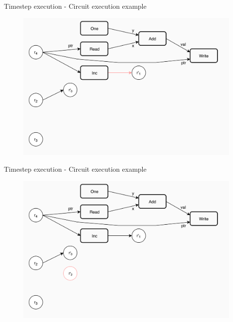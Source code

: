 \documentclass[xcolor={usenames}]{beamer}
\begin{document}
  \begin{frame}{Timestep execution - Circuit execution example}
  	\begin{figure}
  		\centering
  		\includegraphics[width=\textwidth]{../figures/example-circuit-15.png}
  	\end{figure}
  \end{frame}
  \begin{frame}{Timestep execution - Circuit execution example}
  	\begin{figure}
  		\centering
  		\includegraphics[width=\textwidth]{../figures/example-circuit-16.png}
  	\end{figure}
  \end{frame}
\end{document}
